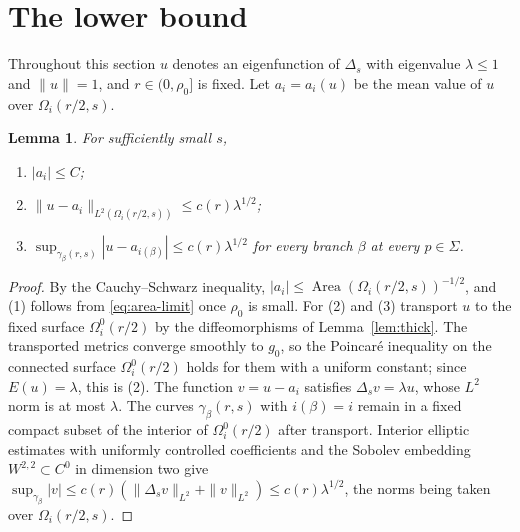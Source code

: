 \documentclass[11pt]{amsart}
\newtheorem{lemma}[theorem]{Lemma}
\theoremstyle{definition}
\theoremstyle{remark}
\newcommand{\area}{\operatorname{Area}}
\begin{document}
\section{The lower bound}\label{sec:lower}

Throughout this section $u$ denotes an eigenfunction of $\Delta_s$ with
eigenvalue $\lambda\le1$ and $\|u\|=1$, and $r\in(0,\rho_0]$ is fixed.
Let $a_i=a_i(u)$ be the mean value of $u$ over $\Omega_i(r/2,s)$.

\begin{lemma}\label{lem:thick-estimates}
For sufficiently small $s$,
\begin{enumerate}
\item $|a_i|\le C$;
\item $\|u-a_i\|_{L^2(\Omega_i(r/2,s))}\le c(r)\lambda^{1/2}$;
\item $\sup_{\gamma_\beta(r,s)}|u-a_{i(\beta)}|\le c(r)\lambda^{1/2}$ for
every branch $\beta$ at every $p\in\Sigma$.
\end{enumerate}
\end{lemma}
\begin{proof}
By the Cauchy--Schwarz inequality,
$|a_i|\le\area(\Omega_i(r/2,s))^{-1/2}$, and (1) follows from
\eqref{eq:area-limit} once $\rho_0$ is small. For (2) and (3) transport
$u$ to the fixed surface $\Omega_i^0(r/2)$ by the diffeomorphisms of
Lemma~\ref{lem:thick}. The transported metrics converge smoothly to
$g_0$, so the Poincar\'e inequality on the connected surface
$\Omega^0_i(r/2)$ holds for them with a uniform constant; since
$E(u)=\lambda$, this is (2). The function $v=u-a_i$ satisfies
$\Delta_sv=\lambda u$, whose $L^2$ norm is at most $\lambda$. The curves
$\gamma_\beta(r,s)$ with $i(\beta)=i$ remain in a fixed compact subset of
the interior of $\Omega_i^0(r/2)$ after transport. Interior elliptic
estimates with uniformly controlled coefficients and the Sobolev embedding
$W^{2,2}\subset C^0$ in dimension two give
$\sup_{\gamma_\beta}|v|\le c(r)(\|\Delta_sv\|_{L^2}+\|v\|_{L^2})
\le c(r)\lambda^{1/2}$, the norms being taken over $\Omega_i(r/2,s)$.
\end{proof}
\end{document}
